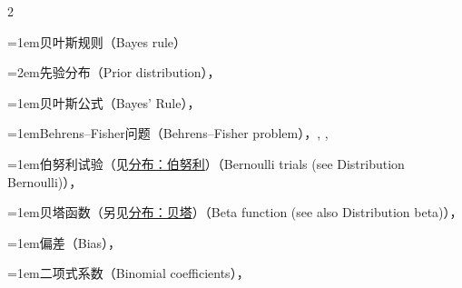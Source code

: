 \begin{multicols}{2}
\par\addvspace{2pt}
\par\noindent\hangindent=1em\hspace*{0em}\label{idx:84}贝叶斯规则（Bayes rule）\par
\par\noindent\hangindent=2em\hspace*{1em}\label{idx:85}先验分布（Prior distribution），\hyperref[idxocc:85:316]{\pageref*{idxocc:85:316}}\par
\par\addvspace{2pt}
\par\noindent\hangindent=1em\hspace*{0em}\label{idx:86}贝叶斯公式（Bayes’ Rule），\hyperref[thm:1.3.5]{\pageref*{thm:1.3.5}}\par
\par\addvspace{2pt}
\par\noindent\hangindent=1em\hspace*{0em}\label{idx:87}Behrens–Fisher问题（Behrens–Fisher problem），\hyperref[exercise:8.42]{\pageref*{exercise:8.42}}, \hyperref[idxocc:87:455]{\pageref*{idxocc:87:455}}, \hyperref[idxocc:87:500]{\pageref*{idxocc:87:500}}\par
{}
\par\addvspace{2pt}
\par\noindent\hangindent=1em\hspace*{0em}\label{idx:88}伯努利试验（见\hyperref[idx:252]{分布：伯努利}）（Bernoulli trials (see Distribution Bernoulli)），\hyperref[idxocc:88:104]{\pageref*{idxocc:88:104}}\par
\par\addvspace{2pt}
\par\noindent\hangindent=1em\hspace*{0em}\label{idx:89}贝塔函数（另见\hyperref[idx:254]{分布：贝塔}）（Beta function (see also Distribution beta)），\hyperref[eq:3.3.17]{\pageref*{eq:3.3.17}}\par
\par\addvspace{2pt}
\par\noindent\hangindent=1em\hspace*{0em}\label{idx:90}偏差（Bias），\hyperref[def:7.3.2]{\pageref*{def:7.3.2}}\par
\par\addvspace{2pt}
\par\noindent\hangindent=1em\hspace*{0em}\label{idx:91}二项式系数（Binomial coefficients），\hyperref[def:1.2.17]{\pageref*{def:1.2.17}}\par

\end{multicols}

